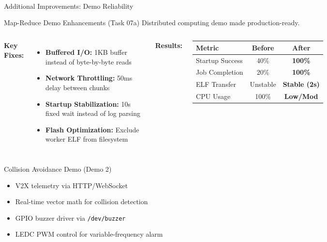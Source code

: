 \documentclass[aspectratio=169, 10pt]{beamer}
\begin{document}
\begin{frame}{Additional Improvements: Demo Reliability}
    \begin{block}{Map-Reduce Demo Enhancements (Task 07a)}
        Distributed computing demo made production-ready.
    \end{block}

    \vspace{0.2cm}
    \begin{columns}[T]
        \textbf{Key Fixes:}
        \vspace{0.1cm}
        \begin{itemize}\setlength{\itemsep}{3pt}
            \item \textbf{Buffered I/O:} 1KB buffer instead of byte-by-byte reads
            \item \textbf{Network Throttling:} 50ms delay between chunks
            \item \textbf{Startup Stabilization:} 10s fixed wait instead of log parsing
            \item \textbf{Flash Optimization:} Exclude worker ELF from filesystem
        \end{itemize}

        \textbf{Results:}
        \vspace{0.1cm}
        \begin{table}
            \tiny
            \begin{tabular}{@{}lcc@{}}
                \toprule
                \textbf{Metric} & \textbf{Before} & \textbf{After} \\
                \midrule
                Startup Success & 40\% & \textbf{100\%} \\
                Job Completion & 20\% & \textbf{100\%} \\
                ELF Transfer & Unstable & \textbf{Stable (2s)} \\
                CPU Usage & 100\% & \textbf{Low/Mod} \\
                \bottomrule
            \end{tabular}
        \end{table}
    \end{columns}

    \vspace{0.3cm}
    \begin{exampleblock}{Collision Avoidance Demo (Demo 2)}
        \begin{itemize}\setlength{\itemsep}{2pt}
            \item V2X telemetry via HTTP/WebSocket
            \item Real-time vector math for collision detection
            \item GPIO buzzer driver via \texttt{/dev/buzzer}
            \item LEDC PWM control for variable-frequency alarm
        \end{itemize}
    \end{exampleblock}
\end{frame}
\end{document}
